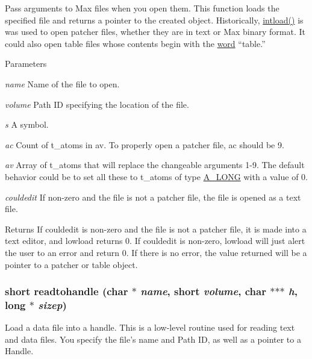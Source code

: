 Pass arguments to Max files when you open them. This function loads the specified file and returns a pointer to the created object. Historically, \hyperlink{group__loading__max__files_gaf04b19ac11c4ce1d2641aa409cbd7128}{intload()} is was used to open patcher files, whether they are in text or Max binary format. It could also open table files whose contents begin with the \hyperlink{unionword}{word} “table.”


\begin{DoxyParams}{Parameters}
\item[{\em name}]Name of the file to open. \item[{\em volume}]Path ID specifying the location of the file. \item[{\em s}]A symbol. \item[{\em ac}]Count of t\_\-atoms in av. To properly open a patcher file, ac should be 9. \item[{\em av}]Array of t\_\-atoms that will replace the changeable arguments 1-\/9. The default behavior could be to set all these to t\_\-atoms of type \hyperlink{group__atom_gga8aa6700e9f00b132eb376db6e39ade47a002f28879581a6f66ea492b994b96f1e}{A\_\-LONG} with a value of 0. \item[{\em couldedit}]If non-\/zero and the file is not a patcher file, the file is opened as a text file. \end{DoxyParams}
\begin{DoxyReturn}{Returns}
If couldedit is non-\/zero and the file is not a patcher file, it is made into a text editor, and lowload returns 0. If couldedit is non-\/zero, lowload will just alert the user to an error and return 0. If there is no error, the value returned will be a pointer to a patcher or table object. 
\end{DoxyReturn}
\hypertarget{group__loading__max__files_ga7060a31b3b59a0ba1b08cd5f7b89704b}{
\subsubsection[{readtohandle}]{\setlength{\rightskip}{0pt plus 5cm}short readtohandle (char $\ast$ {\em name}, \/  short {\em volume}, \/  char $\ast$$\ast$$\ast$ {\em h}, \/  long $\ast$ {\em sizep})}}
\label{group__loading__max__files_ga7060a31b3b59a0ba1b08cd5f7b89704b}


Load a data file into a handle. This is a low-\/level routine used for reading text and data files. You specify the file’s name and Path ID, as well as a pointer to a Handle.


